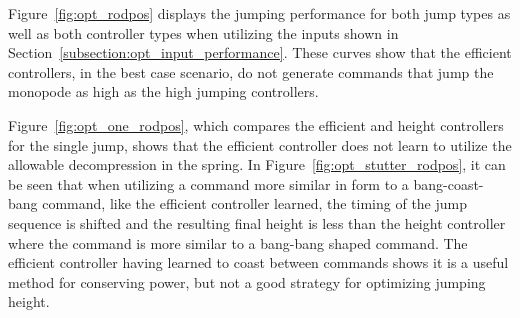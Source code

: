 Figure~\ref{fig:opt_rodpos} displays the jumping performance for both jump types as well as both controller types when utilizing the inputs shown in Section~\ref{subsection:opt_input_performance}. These curves show that the efficient controllers, in the best case scenario, do not generate commands that jump the monopode as high as the high jumping controllers.

Figure~\ref{fig:opt_one_rodpos}, which compares the efficient and height controllers for the single jump, shows that the efficient controller does not learn to utilize the allowable decompression in the spring. In Figure~\ref{fig:opt_stutter_rodpos}, it can be seen that when utilizing a command more similar in form to a bang-coast-bang command, like the efficient controller learned, the timing of the jump sequence is shifted and the resulting final height is less than the height controller where the command is more similar to a bang-bang shaped command. The efficient controller having learned to coast between commands shows it is a useful method for conserving power, but not a good strategy for optimizing jumping height. 

